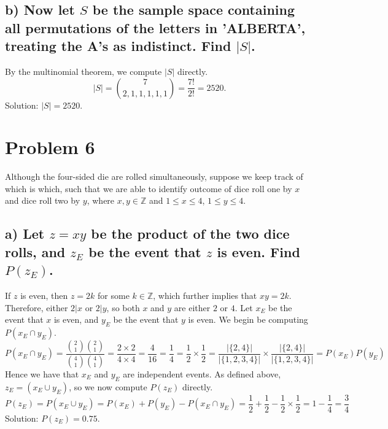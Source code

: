 \documentclass[11pt, letterpaper]{article}
\begin{document}
\subsection*{b) \normalfont Now let $S$ be the sample space containing all permutations of the letters in 
'ALBERTA', treating the A's as indistinct. Find $|S|$.}
By the multinomial theorem, we compute $|S|$ directly.
\[|S|={7 \choose 2,1,1,1,1,1}=\frac{7!}{2!}=2520.\]
Solution: $|S|=2520$.

\section*{Problem 6}
Although the four-sided die are rolled simultaneously, suppose we keep track of which is which, such
that we are able to identify outcome of dice roll one by $x$ and dice roll two by $y$, where $x,y\in\mathbb{Z}$
and $1\leq x\leq 4$, $1\leq y\leq 4$.

\subsection*{a) \normalfont Let $z=xy$ be the product of the two dice rolls, and $z_E$ be the event that $z$ is even.
Find $P(z_E)$.}
If $z$ is even, then $z=2k$ for some $k\in\mathbb{Z}$, which further implies that $xy=2k$. Therefore, either $2|x$ or $2|y$,
so both $x$ and $y$ are either $2$ or $4$. Let $x_E$ be the event that $x$ is even, and $y_E$ be the event that $y$ is even.
We begin be computing $P(x_E\cap y_E)$.
\[P(x_E\cap y_E)=\frac{{2 \choose 1}{2 \choose 1}}{{4 \choose 1}{4 \choose 1}}=\frac{2\times 2}{4\times 4}=\frac{4}{16}=\frac{1}{4}=\frac{1}{2}\times\frac{1}{2}=\frac{|\{2, 4\}|}{|\{1,2,3,4\}|}\times\frac{|\{2, 4\}|}{|\{1,2,3,4\}|}=P(x_E)P(y_E)\]
Hence we have that $x_E$ and $y_E$ are independent events. As defined above, $z_E=(x_E\cup y_E)$, so 
we now compute $P(z_E)$ directly.
\[P(z_E)=P(x_E\cup y_E)=P(x_E)+P(y_E)-P(x_E\cap y_E)=\frac{1}{2}+\frac{1}{2}-\frac{1}{2}\times\frac{1}{2}=1-\frac{1}{4}=\frac{3}{4}\]
Solution: $P(z_E)=0.75$.
\end{document}
